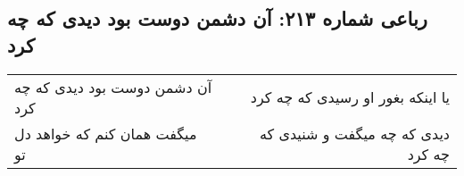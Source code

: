 \begin{center}
\section*{رباعی شماره ۲۱۳: آن دشمن دوست بود دیدی که چه کرد}
\label{sec:sh213}
\begin{longtable}{l p{0.5cm} r}
آن دشمن دوست بود دیدی که چه کرد
&&
یا اینکه بغور او رسیدی که چه کرد
\\
میگفت همان کنم که خواهد دل تو
&&
دیدی که چه میگفت و شنیدی که چه کرد
\\
\end{longtable}
\end{center}
